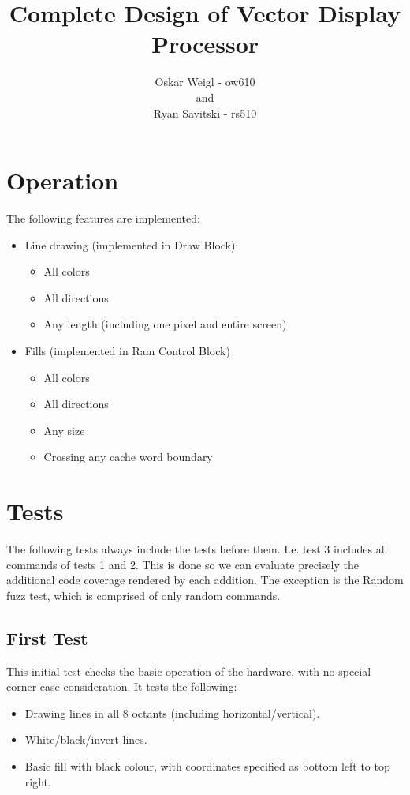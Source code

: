 \documentclass[]{article}
\title{Complete Design of Vector Display Processor}
\author{Oskar Weigl - ow610\\ and \\ Ryan Savitski - rs510}
\begin{document}
\maketitle


\tableofcontents
\clearpage

\section{Operation}
The following features are implemented:
\begin{itemize}
	\item Line drawing (implemented in Draw Block):
	\begin{itemize}
		\item All colors
		\item All directions
		\item Any length (including one pixel and entire screen)
	\end{itemize}
	\item Fills (implemented in Ram Control Block)
	\begin{itemize}
		\item All colors
		\item All directions
		\item Any size
		\item Crossing any cache word boundary
	\end{itemize}
\end{itemize}

\section{Tests} %
\label{sec:tests}

The following tests always include the tests before them. I.e. test 3 includes all commands of tests 1 and 2. This is done so we can evaluate precisely the additional code coverage rendered by each addition. The exception is the Random fuzz test, which is comprised of only random commands.

\subsection{First Test} %
\label{sub:first_test}

This initial test checks the basic operation of the hardware, with no special corner case consideration. It tests the following:
\begin{itemize}
	\item Drawing lines in all 8 octants (including horizontal/vertical).
	\item White/black/invert lines.
	\item Basic fill with black colour, with coordinates specified as bottom left to top right.
\end{itemize}
\end{document}
